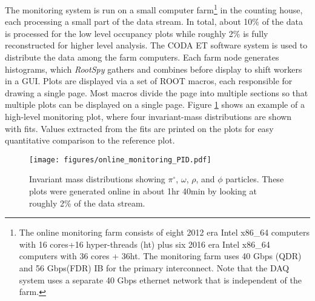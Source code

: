 The monitoring system is run on a small computer farm\footnote{The online monitoring farm consists of eight 2012 era Intel x86\_64 computers with 16 cores+16 hyper-threads (ht) plus six 2016 era Intel x86\_64 computers with 36 cores + 36ht. The monitoring farm uses 40 Gbps (QDR) and 56 Gbps(FDR) IB for the primary interconnect. Note that the DAQ system uses a separate 40 Gbps ethernet network that is independent of the farm.} in the counting house, each processing a small part of the data stream. In total, about 10\% of the data is processed for the low level occupancy plots while roughly 2\% is fully reconstructed for higher level analysis. The CODA ET software system is used to distribute the data among the farm computers. Each farm node generates histograms, which \textit{RootSpy} gathers and combines before display to shift workers in a GUI.
Plots are displayed via a set of ROOT macros, each responsible for drawing a single page. Most macros divide the page into multiple sections so that multiple plots can be displayed on a single page. Figure \ref{fig:online_monitoring_PID} shows an example of a high-level monitoring plot, where four invariant-mass distributions are shown with fits. Values extracted from the fits are printed on the plots for easy quantitative comparison to the reference plot. 



\begin{figure}[tbp]
\begin{center}
\texttt{[image: figures/online\_monitoring\_PID.pdf]}
\caption{\label{fig:online_monitoring_PID}Invariant mass distributions showing $\pi^\circ$, $\omega$, $\rho$, and $\phi$ particles. These plots were generated online in about 1hr 40min by looking at roughly 2\% of the data stream.}   
\end{center}  
\end{figure}

